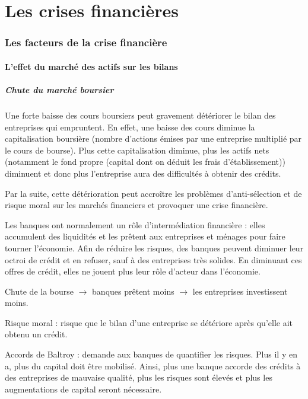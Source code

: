 \part{Les crises financières}

\section{Les facteurs de la crise financière}	
	
	\subsection{L'effet du marché des actifs sur les bilans}
	
		\subsubsection{Chute du marché boursier}
	
		Une forte baisse des cours boursiers peut gravement détériorer le bilan des entreprises qui empruntent. En effet, une baisse des cours diminue la capitalisation boursière (nombre d'actions émises par une entreprise multiplié par le cours de bourse). Plus cette capitalisation diminue, plus les actifs nets (notamment le fond propre (capital dont on déduit les frais d'établissement)) diminuent et donc plus l'entreprise aura des difficultés à obtenir des crédits.
	
		Par la suite, cette détérioration peut accroître les problèmes d'anti-sélection et de risque moral sur les marchés financiers et provoquer une crise financière. 
	
		Les banques ont normalement un rôle d'intermédiation financière : elles accumulent des liquidités et les prêtent aux entreprises et ménages pour faire tourner l'économie. Afin de réduire les risques, des banques peuvent diminuer leur octroi de crédit et en refuser, sauf à des entreprises très solides. En diminuant ces offres de crédit, elles ne jouent plus leur rôle d'acteur dans l'économie.
	
		Chute de la bourse $\rightarrow$ banques prêtent moins $\rightarrow$ les entreprises investissent moins.

		Risque moral : risque que le bilan d'une entreprise se détériore après qu'elle ait obtenu un crédit.
	
		Accords de Baltroy : demande aux banques de quantifier les risques. Plus il y en a, plus du capital doit être mobilisé. Ainsi, plus une banque accorde des crédits à des entreprises de mauvaise qualité, plus les risques sont élevés et plus les augmentations de capital seront nécessaire.
		
